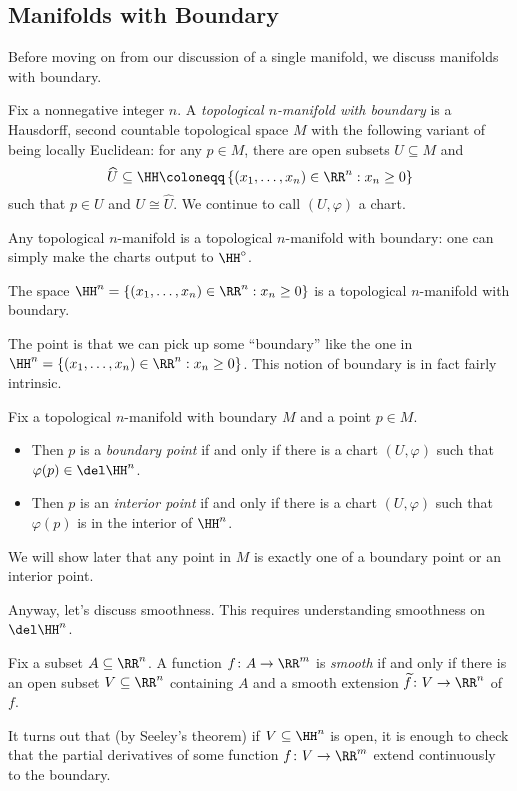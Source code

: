 \documentclass[../notes.tex]{subfiles}
\begin{document}
\subsection{Manifolds with Boundary}
Before moving on from our discussion of a single manifold, we discuss manifolds with boundary.
\begin{definition}
	Fix a nonnegative integer $n$. A \textit{topological $n$-manifold with boundary} is a Hausdorff, second countable topological space $M$ with the following variant of being locally Euclidean: for any $p\in M$, there are open subsets $U\subseteq M$ and
	\[\widehat U\subseteq\HH\coloneqq\left\{(x_1,\ldots,x_n)\in\RR^n:x_n\ge0\right\}\]
	such that $p\in U$ and $U\cong\widehat U$. We continue to call $(U,\varphi)$ a chart.
\end{definition}
\begin{example}
	Any topological $n$-manifold is a topological $n$-manifold with boundary: one can simply make the charts output to $\HH^\circ$.
\end{example}
\begin{example}
	The space $\HH^n=\left\{(x_1,\ldots,x_n)\in\RR^n:x_n\ge0\right\}$ is a topological $n$-manifold with boundary.
\end{example}
The point is that we can pick up some ``boundary'' like the one in $\HH^n=\left\{(x_1,\ldots,x_n)\in\RR^n:x_n\ge0\right\}$. This notion of boundary is in fact fairly intrinsic.
\begin{defihelper}  
	Fix a topological $n$-manifold with boundary $M$ and a point $p\in M$.
	\begin{itemize}
		\item Then $p$ is a \textit{boundary point} if and only if there is a chart $(U,\varphi)$ such that $\varphi(p)\in\del\HH^n$.
		\item Then $p$ is an \textit{interior point} if and only if there is a chart $(U,\varphi)$ such that $\varphi(p)$ is in the interior of $\HH^n$.
	\end{itemize}
\end{defihelper}
We will show later that any point in $M$ is exactly one of a boundary point or an interior point.

Anyway, let's discuss smoothness. This requires understanding smoothness on $\del\HH^n$.
\begin{definition}
	Fix a subset $A\subseteq\RR^n$. A function $f\colon A\to\RR^m$ is \textit{smooth} if and only if there is an open subset $V\subseteq\RR^n$ containing $A$ and a smooth extension $\widetilde f\colon V\to\RR^n$ of $f$.
\end{definition}
\begin{remark}
	It turns out that (by Seeley's theorem) if $V\subseteq\HH^n$ is open, it is enough to check that the partial derivatives of some function $f\colon V\to\RR^m$ extend continuously to the boundary.
\end{remark}
\end{document}
